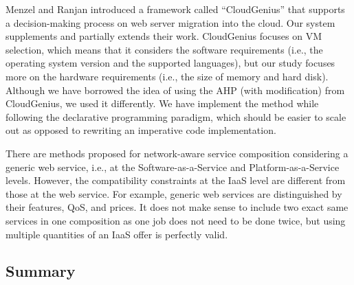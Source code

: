 Menzel and Ranjan introduced a framework called
“CloudGenius” \cite{CloudGenius} that supports a decision-making process on web
server migration into the cloud. Our system supplements and
partially extends their work. CloudGenius \cite{CloudGenius} focuses on
VM selection, which means that it considers the software requirements
(i.e., the operating system version and the supported
languages), but our study focuses more on the hardware requirements
(i.e., the size of memory and hard disk). Although we
have borrowed the idea of using the AHP (with modification) from CloudGenius,
we used it differently. We have implement the method while following the declarative programming
paradigm, which should be easier to scale out as opposed to rewriting an imperative code implementation.

There are methods proposed for network-aware service composition
\cite{Yu2007, Benatallah2004, Zheng2013}
considering a generic web service, i.e., at the
Software-as-a-Service and Platform-as-a-Service levels. However,
the compatibility constraints at the IaaS level are different
from those at the web service. For example, generic web
services are distinguished by their features, QoS, and prices.
It does not make sense to include two exact same services in
one composition as one job does not need to be done twice, but
using multiple quantities of an IaaS offer is perfectly valid.

\subsection{Summary}

